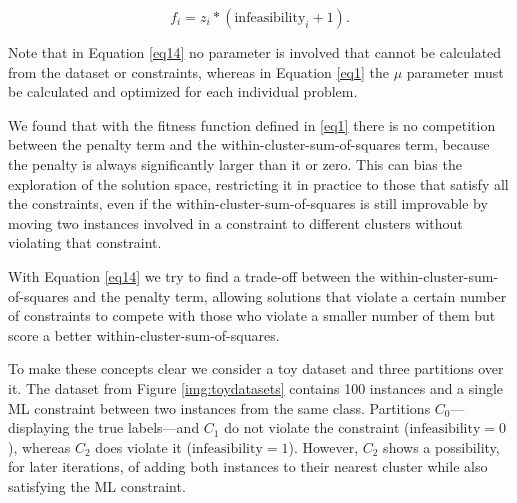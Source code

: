 \documentclass[review]{elsarticle}
\begin{document}
\begin{equation}
f_i = z_i * (\text{infeasibility}_i + 1).
\label{eq14}
\end{equation}

Note that in Equation \eqref{eq14} no parameter is involved that cannot be calculated from the dataset or constraints, whereas in Equation \eqref{eq1} the $\mu$ parameter must be calculated and optimized for each individual problem.

We found that with the fitness function defined in \eqref{eq1} there is no competition between the penalty term and the within-cluster-sum-of-squares term, because the penalty is always significantly larger than it or zero. This can bias the exploration of the solution space, restricting it in practice to those that satisfy all the constraints, even if the within-cluster-sum-of-squares is still improvable by moving two instances involved in a constraint to different clusters without violating that constraint.

With Equation \eqref{eq14} we try to find a trade-off between the within-cluster-sum-of-squares and the penalty term, allowing solutions that violate a certain number of constraints to compete with those who violate a smaller number of them but score a better within-cluster-sum-of-squares.

To make these concepts clear we consider a toy dataset and three partitions over it. The dataset from Figure \ref{img:toydatasets} contains 100 instances and a single ML constraint between two instances from the same class. Partitions $C_0$---displaying the true labels---and $C_1$ do not violate the constraint ($\text{infeasibility} = 0$), whereas $C_2$ does violate it ($\text{infeasibility} = 1$). However, $C_2$ shows a possibility, for later iterations, of adding both instances to their nearest cluster while also satisfying the ML constraint.
\end{document}
